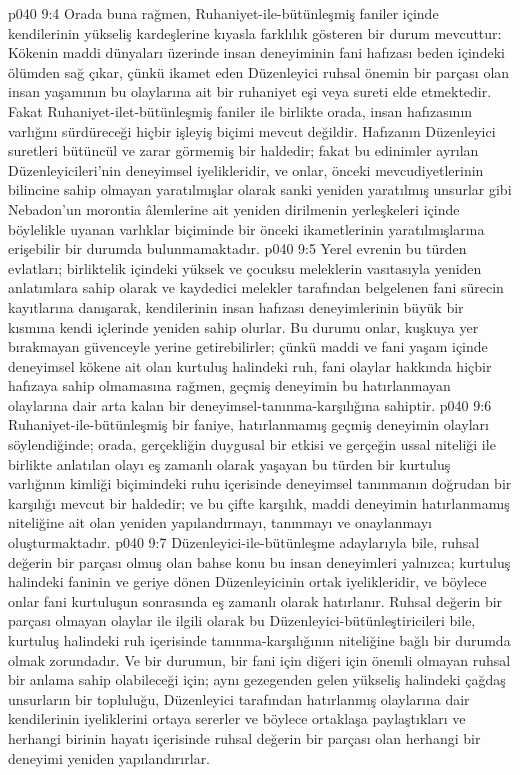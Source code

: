 \vs p040 9:4 Orada buna rağmen, Ruhaniyet\hyp{}ile\hyp{}bütünleşmiş faniler içinde kendilerinin yükseliş kardeşlerine kıyasla farklılık gösteren bir durum mevcuttur: Kökenin maddi dünyaları üzerinde insan deneyiminin fani hafızası beden içindeki ölümden sağ çıkar, çünkü ikamet eden Düzenleyici ruhsal önemin bir parçası olan insan yaşamının bu olaylarına ait bir ruhaniyet eşi veya sureti elde etmektedir. Fakat Ruhaniyet\hyp{}ilet\hyp{}bütünleşmiş faniler ile birlikte orada, insan hafızasının varlığını sürdüreceği hiçbir işleyiş biçimi mevcut değildir. Hafızanın Düzenleyici suretleri bütüncül ve zarar görmemiş bir haldedir; fakat bu edinimler ayrılan Düzenleyicileri’nin deneyimsel iyelikleridir, ve onlar, önceki mevcudiyetlerinin bilincine sahip olmayan yaratılmışlar olarak sanki yeniden yaratılmış unsurlar gibi Nebadon’un morontia âlemlerine ait yeniden dirilmenin yerleşkeleri içinde böylelikle uyanan varlıklar biçiminde bir önceki ikametlerinin yaratılmışlarına erişebilir bir durumda bulunmamaktadır.
\vs p040 9:5 Yerel evrenin bu türden evlatları; birliktelik içindeki yüksek ve çocuksu meleklerin vasıtasıyla yeniden anlatımlara sahip olarak ve kaydedici melekler tarafından belgelenen fani sürecin kayıtlarına danışarak, kendilerinin insan hafızası deneyimlerinin büyük bir kısmına kendi içlerinde yeniden sahip olurlar. Bu durumu onlar, kuşkuya yer bırakmayan güvenceyle yerine getirebilirler; çünkü maddi ve fani yaşam içinde deneyimsel kökene ait olan kurtuluş halindeki ruh, fani olaylar hakkında hiçbir hafızaya sahip olmamasına rağmen, geçmiş deneyimin bu hatırlanmayan olaylarına dair arta kalan bir deneyimsel\hyp{}tanınma\hyp{}karşılığına sahiptir.
\vs p040 9:6 Ruhaniyet\hyp{}ile\hyp{}bütünleşmiş bir faniye, hatırlanmamış geçmiş deneyimin olayları söylendiğinde; orada, gerçekliğin duygusal bir etkisi ve gerçeğin ussal niteliği ile birlikte anlatılan olayı eş zamanlı olarak yaşayan bu türden bir kurtuluş varlığının kimliği biçimindeki ruhu içerisinde deneyimsel tanınmanın doğrudan bir karşılığı mevcut bir haldedir; ve bu çifte karşılık, maddi deneyimin hatırlanmamış niteliğine ait olan yeniden yapılandırmayı, tanınmayı ve onaylanmayı oluşturmaktadır.
\vs p040 9:7 Düzenleyici\hyp{}ile\hyp{}bütünleşme adaylarıyla bile, ruhsal değerin bir parçası olmuş olan bahse konu bu insan deneyimleri yalnızca; kurtuluş halindeki faninin ve geriye dönen Düzenleyicinin ortak iyelikleridir, ve böylece onlar fani kurtuluşun sonrasında eş zamanlı olarak hatırlanır. Ruhsal değerin bir parçası olmayan olaylar ile ilgili olarak bu Düzenleyici\hyp{}bütünleştiricileri bile, kurtuluş halindeki ruh içerisinde tanınma\hyp{}karşılığının niteliğine bağlı bir durumda olmak zorundadır. Ve bir durumun, bir fani için diğeri için önemli olmayan ruhsal bir anlama sahip olabileceği için; aynı gezegenden gelen yükseliş halindeki çağdaş unsurların bir topluluğu, Düzenleyici tarafından hatırlanmış olaylarına dair kendilerinin iyeliklerini ortaya sererler ve böylece ortaklaşa paylaştıkları ve herhangi birinin hayatı içerisinde ruhsal değerin bir parçası olan herhangi bir deneyimi yeniden yapılandırırlar.
